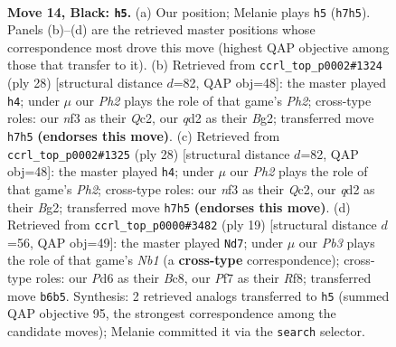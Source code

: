 \documentclass[11pt]{article}
\begin{document}
\clearpage

\begin{figure}[p]\centering
\begin{subfigure}{0.46\textwidth}\centering
\resizebox{\linewidth}{!}{%
\newchessgame
\chessboard[
  setfen={1nbq1rk1/r3bppp/pp1p4/4p1B1/PP2P1n1/2NB1N2/2PQ1PPP/R4RK1 b - - 3 14},
  showmover=false,
  pgfstyle=straightmove, color=movearrow, markmove={h7-h5}
]}
\caption{}
\end{subfigure}\hfill
\begin{subfigure}{0.46\textwidth}\centering
\resizebox{\linewidth}{!}{%
\newchessgame
\chessboard[
  setfen={r4rk1/pp1qppbp/1npnb1p1/6N1/3PP3/NP4P1/1BQ2PBP/3R1RK1 w - - 3 15},
  showmover=false,
  pgfstyle=straightmove, color=movearrow, markmove={h2-h4}
]}
\caption{}
\end{subfigure}
\\[4pt]
\begin{subfigure}{0.46\textwidth}\centering
\resizebox{\linewidth}{!}{%
\newchessgame
\chessboard[
  setfen={r4rk1/pp1qppbp/1npnb1p1/6N1/3PP3/NP4P1/1BQ2PBP/3R1RK1 w - - 5 15},
  showmover=false,
  pgfstyle=straightmove, color=movearrow, markmove={h2-h4}
]}
\caption{}
\end{subfigure}\hfill
\begin{subfigure}{0.46\textwidth}\centering
\resizebox{\linewidth}{!}{%
\newchessgame
\chessboard[
  setfen={rnbq1rk1/1p2ppb1/2pp2pp/p7/P2PPBn1/2N2N2/1PP1BPPP/R2Q1RK1 b - - 1 10},
  showmover=false,
  pgfstyle=straightmove, color=movearrow, markmove={b8-d7}
]}
\caption{}
\end{subfigure}
\caption{\textbf{Move 14, Black: \texttt{h5}.} (a) Our position; Melanie plays \texttt{h5} (\texttt{h7h5}). Panels (b)--(d) are the retrieved master positions whose correspondence most drove this move (highest QAP objective among those that transfer to it). (b) Retrieved from \texttt{ccrl\_top\_p0002\#1324} (ply 28) [structural distance $d$=82, QAP obj=48]: the master played \texttt{h4}; under $\mu$ our \emph{Ph2} plays the role of that game's \emph{Ph2}; cross-type roles: our \emph{n}f3 as their \emph{Q}c2, our \emph{q}d2 as their \emph{B}g2; transferred move \texttt{h7h5} \textbf{(endorses this move)}. (c) Retrieved from \texttt{ccrl\_top\_p0002\#1325} (ply 28) [structural distance $d$=82, QAP obj=48]: the master played \texttt{h4}; under $\mu$ our \emph{Ph2} plays the role of that game's \emph{Ph2}; cross-type roles: our \emph{n}f3 as their \emph{Q}c2, our \emph{q}d2 as their \emph{B}g2; transferred move \texttt{h7h5} \textbf{(endorses this move)}. (d) Retrieved from \texttt{ccrl\_top\_p0000\#3482} (ply 19) [structural distance $d$=56, QAP obj=49]: the master played \texttt{Nd7}; under $\mu$ our \emph{Pb3} plays the role of that game's \emph{Nb1} (a \textbf{cross-type} correspondence); cross-type roles: our \emph{P}d6 as their \emph{B}c8, our \emph{P}f7 as their \emph{R}f8; transferred move \texttt{b6b5}. Synthesis: 2 retrieved analogs transferred to \texttt{h5} (summed QAP objective 95, the strongest correspondence among the candidate moves); Melanie committed it via the \texttt{search} selector.}
\label{fig:thought-m27}
\end{figure}
\end{document}
